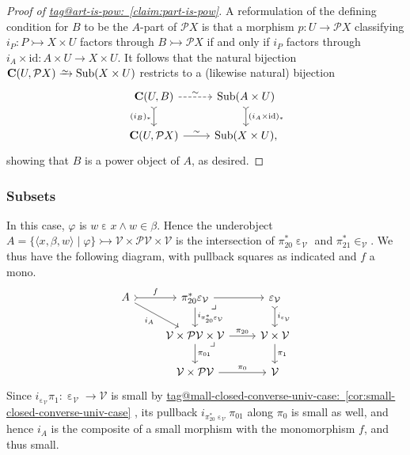 \documentclass{amsart}
\makeatletter
\newcommand\bC{\mathbf{C}}
\newcommand\br[1]{\langle{}#1\rangle{}}
\newcommand\cV{\mathcal{V}}
\newcommand\ein{\mathrel{\varepsilon}}
\newcommand\id{\mathrm{id}}
\newcommand\pb[1][rd]{\ar[#1, phantom, "\lrcorner", pos=0]}
\renewcommand\phi{\varphi}
\newcommand\pow{\mathcal{P}}
\newcommand\set[2][]{#1\{ #2 #1\}}
\newcommand\Sub{\operatorname{Sub}}
\newcommand\toi{\xrightarrow{\raisebox{-2.5pt}[0pt][0pt]{\ensuremath{\scriptstyle{\sim}}}}}
\newcommand\tto{\rightarrowtail}
\newcommand\unein{{\ein}}
\newcommand\unin{{\in}}
\newcommand\tagword[1]{\csname tag@#1\endcsname}
\def\label@tag#1:#2\@nil{#1}
\newcommand\labeltag[1]{\label@tag#1:\@nil}
\newcommand\jref[1]{%
  \texorpdfstring%
    {\hyperref[#1]{\tagword{\labeltag{#1}}~\ref*{#1}}}%
    {\tagword{\labeltag{#1}}~\ref*{#1}}%
}
\theoremstyle{definition}
\theoremstyle{remark}
\theoremstyle{plainwithref}
\makeatother
\begin{document}
\begin{proof}[Proof of \jref{claim:part-is-pow}]
  A reformulation of the defining condition for \( B \) to be the \( A \)-part of \( \pow X \) is that a morphism \( p \colon U \to \pow X \) classifying \( i_P \colon P \tto X \times U \) factors through \( B \tto \pow X \) if and only if \( i_P \) factors through \( i_A \times \id \colon A \times U \to X \times U \).
  It follows that the natural bijection \( \bC(U, \pow X) \toi \Sub(X \times U) \) restricts to a (likewise natural) bijection
  \[
    \begin{tikzcd}
      \bC(U, B) \ar[r, "\sim", dashed] \ar[d, "(i_B)_*"', >->] & \Sub(A \times U) \ar[d, "(i_A \times \id)_*", >->] \\
      \bC(U, \pow X) \ar[r, "\sim"] & \Sub(X \times U),
    \end{tikzcd}
  \]
  showing that \( B \) is a power object of \( A \), as desired.
\end{proof}

\subsubsection{Subsets}
In this case, \( \phi \) is \( w \ein x \wedge w \in \beta \).
Hence the underobject \( A = \set{ \br{x, \beta, w} \mid \phi } \tto \cV \times \pow \cV \times \cV \) is the intersection of \( \pi_{20}^* \unein_\cV \) and \( \pi_{21}^* \unin_{\cV} \).
We thus have the following diagram, with pullback squares as indicated and \( f \) a mono.
\[
  \begin{tikzcd}
    A \ar[r, >->, "f"] \ar[rd, "i_A"'] & \pi_{20}^* \unein_\cV \pb \ar[r] \ar[d, "i_{\pi_{20}^* \unein_\cV}"] & \unein_\cV \ar[d, >->, "i_{\unein_\cV}"] \\
    & \cV \times \pow \cV \times \cV \pb \ar[r, "\pi_{20}"] \ar[d, "\pi_{01}"] & \cV \times \cV \ar[d, "\pi_1"] \\
    & \cV \times \pow \cV \ar[r, "\pi_0"] & \cV
  \end{tikzcd}
\]
Since \( i_{\unein_{\cV}} \pi_1 \colon \unein_{\cV} \to \cV \) is small by \jref{cor:small-closed-converse-univ-case}, its pullback \( i_{\pi_{20}^* \unein_\cV} \pi_{01} \) along \( \pi_0 \) is small as well, and hence \( i_A \) is the composite of a small morphism with the monomorphism \( f \), and thus small.
\end{document}
